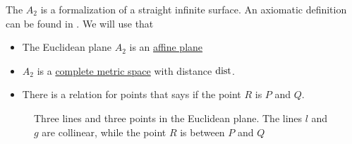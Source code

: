 \begin{definition}\label{def:euclidean_plane}
  The  \( A_2 \) is a formalization of a straight infinite surface. An axiomatic definition can be found in \cite{nLab:euclidean_geometry}. We will use that
  \begin{itemize}
    \item The Euclidean plane \( A_2 \) is an \hyperref[def:affine_plane]{affine plane}
    \item \( A_2 \) is a \hyperref[def:complete_metric_space]{complete metric space} with distance \( \operatorname{dist} \).
    \item There is a  relation for points that says if the point \( R \) is  \( P \) and \( Q \).
  \end{itemize}

  \begin{figure}
    \centering
    \iffalse\begin{mplibcode}
      input metapost/plotting;

      u := 1.5cm;

      beginfig(1);
      path l, g, h, P, Q, R;
      l = (0, -1) * u -- (3, 0) * u;
      draw l;
      label.top("$l$", midpoint of l);

      g = (0, -2) * u -- (3, -1) * u;
      draw g;
      label.bot("$g$", midpoint of g);

      h = (0, 0) * u -- (3, -2) * u;
      draw h;
      label.urt("$h$", midpoint of h);

      P = dot shifted point 0.2 of h;
      fill P;
      label.llft("$P$", midpoint of P);

      Q = dot shifted point 0.8 of h;
      fill Q;
      label.llft("$Q$", midpoint of Q);

      R = dot shifted point 0.4 of h;
      fill R;
      label.llft("$R$", midpoint of R);
      endfig;
    \end{mplibcode}\fi
    \caption{Three lines and three points in the Euclidean plane. The lines \( l \) and \( g \) are collinear, while the point \( R \) is between \( P \) and \( Q \)}\label{def:affine_plane/figure}
  \end{figure}
\end{definition}

